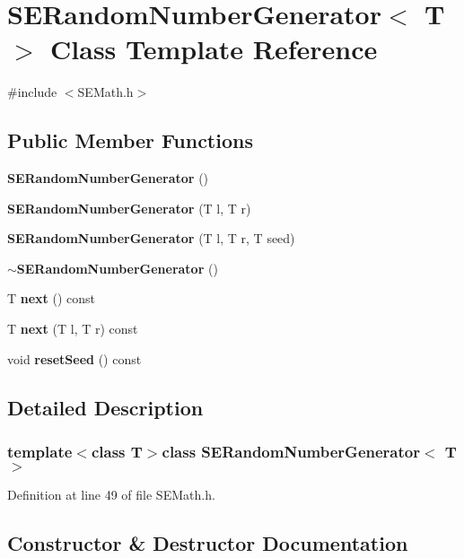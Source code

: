 \section{S\+E\+Random\+Number\+Generator$<$ T $>$ Class Template Reference}
\label{class_s_e_random_number_generator}


{\ttfamily \#include $<$S\+E\+Math.\+h$>$}

\subsection*{Public Member Functions}
\begin{DoxyCompactItemize}
\item 
{\bf S\+E\+Random\+Number\+Generator} ()
\item 
{\bf S\+E\+Random\+Number\+Generator} (T l, T r)
\item 
{\bf S\+E\+Random\+Number\+Generator} (T l, T r, T seed)
\item 
{\bf $\sim$\+S\+E\+Random\+Number\+Generator} ()
\item 
T {\bf next} () const 
\item 
T {\bf next} (T l, T r) const 
\item 
void {\bf reset\+Seed} () const 
\end{DoxyCompactItemize}


\subsection{Detailed Description}
\subsubsection*{template$<$class T$>$class S\+E\+Random\+Number\+Generator$<$ T $>$}



Definition at line 49 of file S\+E\+Math.\+h.



\subsection{Constructor \& Destructor Documentation}
